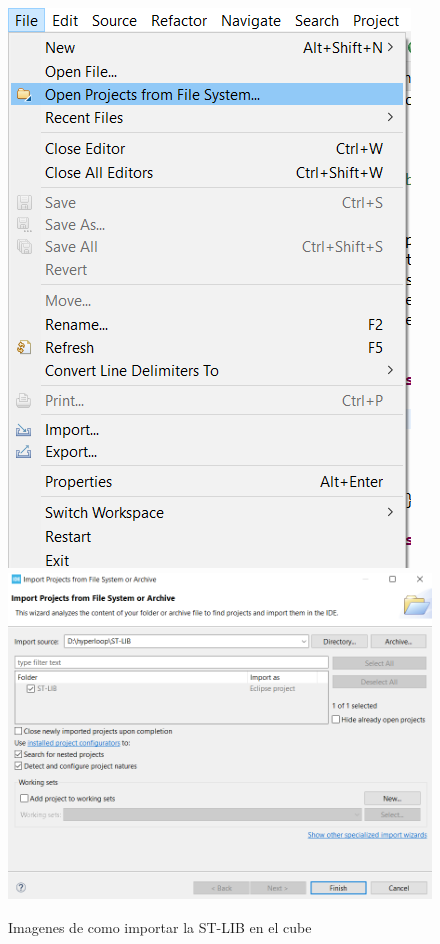\documentclass{report}
\begin{document}
\begin{figure}[h]
\includegraphics[scale=0.6]{Imagenes/Open Projects from File System.png}
\includegraphics[scale=0.5]{Imagenes/importing ST-LIB.png}
\caption{Imagenes de como importar la ST-LIB en el cube}
\label{STLIBimport}
\end{figure}
\end{document}

